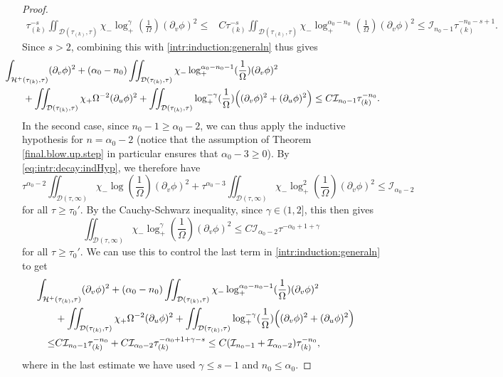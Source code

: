 \documentclass[10pt, reqno]{amsart}
\theoremstyle{definition}
\theoremstyle{remark}
\numberwithin{equation}{section}
\newcommand{\rd}{\partial}
\newcommand{\bb}{\Big}
\newcommand{\0}{\emptyset}
\newcommand{\alp}{\alpha}
\newcommand{\Omg}{\Omega}
\newcommand{\calD}{\mathcal D}
\newcommand{\calH}{\mathcal H}
\newcommand{\calI}{\mathcal I}
\newcommand{\f}{\frac}
\newcommand{\EH}{\calH^{+}}
\begin{document}
\begin{proof}
\begin{equation*}
\begin{split}
\tau_{(k)}^{-s}\iint_{\calD(\tau_{(k)}, \tau)} \chi_-\log_+^{\gamma}(\f{1}{\Omg})(\rd_v\phi)^2\leq &C\tau_{(k)}^{-s}\iint_{\calD(\tau_{(k)}, \tau)} \chi_{-} \log_+^{\alp_{0}-n_0} (\frac{1}{\Omg}) (\rd_{v} \phi)^{2}\leq \calI_{n_0-1}\tau_{(k)}^{-n_0-s+1}.
\end{split}
\end{equation*}
Since $s>2$, combining this with \eqref{intr:induction:generaln} thus gives
\begin{equation} \label{intr:induction:generaln.1}
\begin{aligned}
& \hskip-2em
	 \int_{\EH(\tau_{(k)}, \tau)} (\rd_{v} \phi)^{2} 
	+  (\alp_0-n_0)\iint_{\calD(\tau_{(k)}, \tau)} \chi_{-} \log_+^{\alp_{0}-n_0-1} (\frac{1}{\Omg}) (\rd_{v} \phi)^{2} \\
	& +  \iint_{\calD(\tau_{(k)}, \tau)} \chi_{+} \Omg^{-2} (\rd_{u} \phi)^{2} 
	+  \iint_{\calD(\tau_{(k)}, \tau)} \log_+^{-\gamma}(\f{1}{\Omg}) \bb( (\rd_{v} \phi)^{2} + (\rd_{u} \phi)^{2} \bb)
	\leq C\calI_{n_0-1}\tau_{(k)}^{-n_0}.
\end{aligned}
\end{equation}
In the second case, since $n_0-1\geq \alp_0-2$, we can thus apply the inductive hypothesis for $n=\alp_0-2$ (notice that the assumption of Theorem \ref{final.blow.up.step} in particular ensures that $\alp_0-3\geq 0$). By \eqref{eq:intr:decay:indHyp}, we therefore have 
$$  \tau^{\alp_0-2}\iint_{\calD(\tau, \infty)} \chi_{-} \log (\frac{1}{\Omg}) (\rd_{v} \phi)^{2}+\tau^{\alp_0-3}\iint_{\calD(\tau, \infty)} \chi_{-} \log_+^2 (\frac{1}{\Omg}) (\rd_{v} \phi)^{2}\leq \mathcal I_{\alp_0-2}$$
for all $\tau\geq \tau_0'$. By the Cauchy-Schwarz inequality, since $\gamma\in (1,2]$, this then gives
$$ \iint_{\calD(\tau, \infty)} \chi_{-} \log_+^{\gamma} (\frac{1}{\Omg}) (\rd_{v} \phi)^{2}\leq C\mathcal I_{\alp_0-2}\tau^{-\alp_0+1+\gamma}$$
for all $\tau\geq \tau_0'$. We can use this to control the last term in \eqref{intr:induction:generaln} to get
\begin{equation} \label{intr:induction:generaln.2}
\begin{aligned}
& \hskip-2em
	 \int_{\EH(\tau_{(k)}, \tau)} (\rd_{v} \phi)^{2} 
	+  (\alp_0-n_0)\iint_{\calD(\tau_{(k)}, \tau)} \chi_{-} \log_+^{\alp_{0}-n_0-1} (\frac{1}{\Omg}) (\rd_{v} \phi)^{2} \\
	& +  \iint_{\calD(\tau_{(k)}, \tau)} \chi_{+} \Omg^{-2} (\rd_{u} \phi)^{2} 
	+  \iint_{\calD(\tau_{(k)}, \tau)} \log_+^{-\gamma}(\f{1}{\Omg}) \bb( (\rd_{v} \phi)^{2} + (\rd_{u} \phi)^{2} \bb)\\
	\leq &C\calI_{n_0-1}\tau_{(k)}^{-n_0}+C\mathcal I_{\alp_0-2}\tau_{(k)}^{-\alp_0+1+\gamma-s}\leq C(\calI_{n_0-1}+\calI_{\alp_0-2})\tau_{(k)}^{-n_0},
\end{aligned}
\end{equation}
where in the last estimate we have used $\gamma\leq s-1$ and $n_0\leq \alp_0$.


\end{proof}
\end{document}
